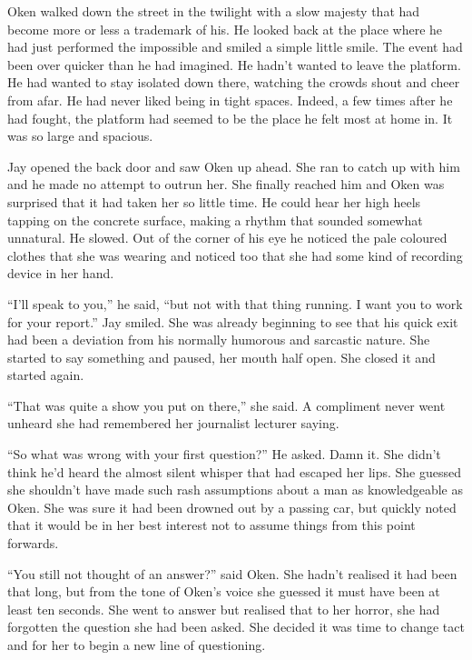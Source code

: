 \thoughtbreak



Oken walked down the street in the twilight with a slow majesty that had become more or less a trademark of his.  He looked back at the place where he had just performed the impossible and smiled a simple little smile.  The event had been over quicker than he had imagined.  He hadn't wanted to leave the platform.  He had wanted to stay isolated down there, watching the crowds shout and cheer from afar.  He had never liked being in tight spaces.  Indeed, a few times after he had fought, the platform had seemed to be the place he felt most at home in.  It was so large and spacious.

Jay opened the back door and saw Oken up ahead.  She ran to catch up with him and he made no attempt to outrun her.  She finally reached him and Oken was surprised that it had taken her so little time.  He could hear her high heels tapping on the concrete surface, making a rhythm that sounded somewhat unnatural.  He slowed.  Out of the corner of his eye he noticed the pale coloured clothes that she was wearing and noticed too that she had some kind of recording device in her hand.

``I'll speak to you,'' he said, ``but not with that thing running.  I want you to work for your report.''  Jay smiled.  She was already beginning to see that his quick exit had been a deviation from his normally humorous and sarcastic nature.  She started to say something and paused, her mouth half open.  She closed it and started again.

``That was quite a show you put on there,'' she said.  A compliment never went unheard she had remembered her journalist lecturer saying.

``So what was wrong with your first question?''  He asked.  Damn it.  She didn't think he'd heard the almost silent whisper that had escaped her lips.  She guessed she shouldn't have made such rash assumptions about a man as knowledgeable as Oken.  She was sure it had been drowned out by a passing car, but quickly noted that it would be in her best interest not to assume things from this point forwards.  

``You still not thought of an answer?'' said Oken.  She hadn't realised it had been that long, but from the tone of Oken's voice she guessed it must have been at least ten seconds.   She went to answer but realised that to her horror, she had forgotten the question she had been asked.  She decided it was time to change tact and for her to begin a new line of questioning.

